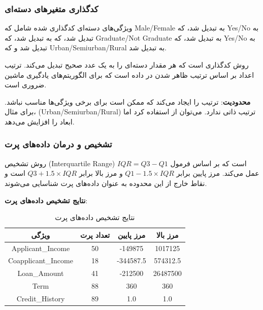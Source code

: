 \documentclass{article}
\begin{document}
\subsubsection{کدگذاری متغیرهای دسته‌ای}

ویژگی‌های دسته‌ای کدگذاری شده شامل  که Male/Female به  تبدیل شد،  که Yes/No به  تبدیل شد،  که  به  تبدیل شد،  که Graduate/Not Graduate به  تبدیل شد،  که Yes/No به  تبدیل شد و  که Urban/Semiurban/Rural به  تبدیل شد.

روش کدگذاری  است که هر مقدار دسته‌ای را به یک عدد صحیح تبدیل می‌کند. ترتیب اعداد بر اساس ترتیب ظاهر شدن در داده است که برای الگوریتم‌های یادگیری ماشین ضروری است.

\textbf{محدودیت}:  ترتیب را ایجاد می‌کند که ممکن است برای برخی ویژگی‌ها مناسب نباشد. برای مثال،  (Urban/Semiurban/Rural) ترتیب ذاتی ندارد. می‌توان از  استفاده کرد اما ابعاد را افزایش می‌دهد.

\subsubsection{تشخیص و درمان داده‌های پرت}

روش تشخیص  (Interquartile Range) است که بر اساس فرمول $IQR = Q3 - Q1$ عمل می‌کند. مرز پایین برابر $Q1 - 1.5 \times IQR$ و مرز بالا برابر $Q3 + 1.5 \times IQR$ است و نقاط خارج از این محدوده به عنوان داده‌های پرت شناسایی می‌شوند.

\textbf{نتایج تشخیص داده‌های پرت}:
\begin{table}[h!]
\centering
\small
\begin{tabular}{|c|c|c|c|}
\hline
\textbf{ویژگی} & \textbf{تعداد پرت} & \textbf{مرز پایین} & \textbf{مرز بالا} \\
\hline
Applicant\_Income & 50 & -149875 & 1017125 \\
\hline
Coapplicant\_Income & 18 & -344587.5 & 574312.5 \\
\hline
Loan\_Amount & 41 & -212500 & 26487500 \\
\hline
Term & 88 & 360 & 360 \\
\hline
Credit\_History & 89 & 1.0 & 1.0 \\
\hline
\end{tabular}
\caption{نتایج تشخیص داده‌های پرت}
\label{tab:outliers}
\end{table}
\end{document}

